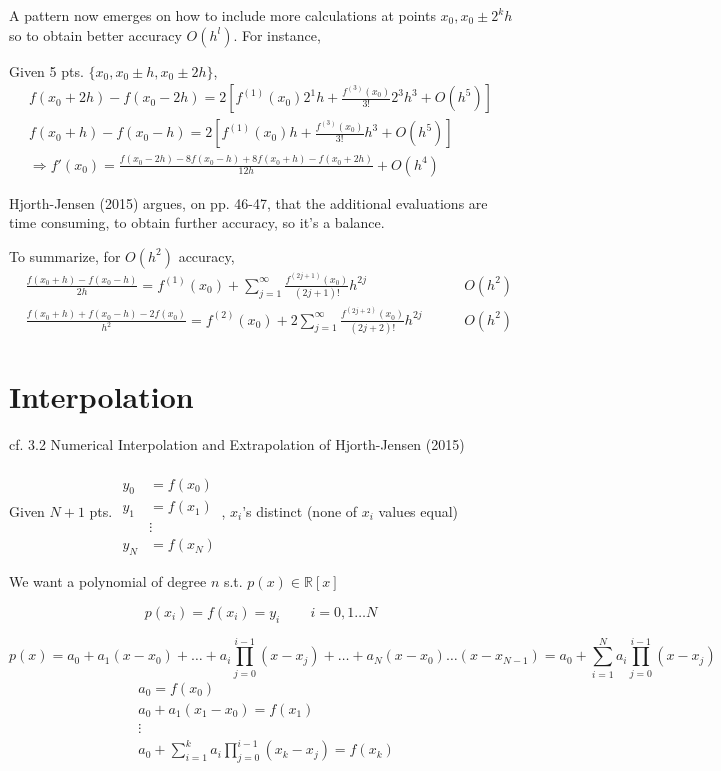 \documentclass[10pt]{amsart}
\begin{document}
\begin{multicols*}{2}
A pattern now emerges on how to include more calculations at points $x_0, x_0 \pm 2^kh$ so to obtain better accuracy $O(h^l)$.  For instance,

Given 5 pts. $\lbrace x_0, x_0 \pm h, x_0 \pm 2h \rbrace$,
\[
\begin{gathered}
  f(x_0 + 2h) - f(x_0 -2h) = 2[ f^{(1)}(x_0) 2^1h + \frac{ f^{(3)}(x_0)}{3!} 2^3 h^3 + O(h^5) ] \\ 
  f(x_0+ h) - f(x_0 - h) = 2[ f^{(1)}(x_0) h + \frac{ f^{(3)}(x_0)}{3!} h^3 + O(h^5)] \\
  \Longrightarrow f'(x_0) = \frac{ f(x_0 - 2h) - 8f(x_0-h ) + 8f(x_0 + h) - f(x_0 + 2h) }{ 12h } + O(h^4)
\end{gathered}
\]

Hjorth-Jensen (2015) \cite{Hjor2015} argues, on pp. 46-47, that the additional evaluations are time consuming, to obtain further accuracy, so it's a balance.

To summarize, for $O(h^2)$ accuracy,
\[
\begin{aligned}
  & \frac{ f(x_0 + h) - f(x_0-h) }{2h} = f^{(1)}(x_0) + \sum_{j=1}^{\infty} \frac{ f^{(2j+1)}(x_0 )}{(2j+1)!} h^{2j} & \qquad \, O(h^2) \\ 
  & \frac{ f(x_0 + h) + f(x_0 -h) - 2f(x_0) }{h^2} = f^{(2)}(x_0) + 2\sum_{j=1}^{\infty} \frac{ f^{(2j+2)}(x_0) }{ (2j+2)!} h^{2j} & \qquad \, O(h^2)
  \end{aligned}
\]

\section{Interpolation}

cf. 3.2 Numerical Interpolation and Extrapolation of Hjorth-Jensen (2015) \cite{Hjor2015}

Given $N+1$ pts. $\begin{aligned} & \quad \\
  y_0 & = f(x_0) \\
  y_1 & = f(x_1) \\
  & \vdots \\
  y_N & = f(x_N) \end{aligned}$, $x_i$'s distinct (none of $x_i$ values equal)

We want a polynomial of degree $n$ s.t. $p(x)  \in \mathbb{R}[x]$

\[
p(x_i) = f(x_i) = y_i \qquad \, i = 0,1\dots N
\]

\[
p(x) = a_0 + a_1(x-x_0) + \dots + a_i \prod_{j=0}^{i-1}(x-x_j) + \dots + a_N(x-x_0) \dots (x-x_{N-1}) = a_0 + \sum_{i=1}^N a_i \prod_{j=0}^{i-1}(x-x_j)
\]
\[
\begin{aligned}
  & a_0 = f(x_0) \\ 
  & a_0 + a_1(x_1-x_0) = f(x_1) \\
  & \vdots \\
  & a_0 + \sum_{i=1}^k a_i \prod_{j=0}^{i-1} (x_k - x_j) = f(x_k)
  \end{aligned}
\]


\end{multicols*}
\end{document}
